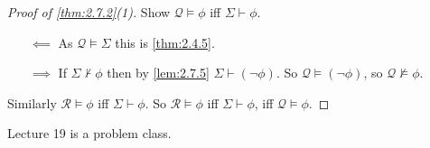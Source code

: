 \documentclass{article}
\newcommand{\rb}[1]{\left( #1 \right)}
\newcommand{\notb}[1]{\rb{\neg #1}}
\theoremstyle{definition}\newtheorem{definition}{Definition}[subsection]
\theoremstyle{definition}\newtheorem{remark}[definition]{Remark}
\theoremstyle{definition}\newtheorem*{example}{Example}
\theoremstyle{definition}\newtheorem*{note}{Note}
\begin{document}
\begin{proof}[Proof of \ref{thm:2.7.2}(1)]
Show $ \mathcal{Q} \vDash \phi $ iff $ \Sigma \vdash \phi $.
\begin{itemize}
\item[$ \impliedby $] As $ \mathcal{Q} \vDash \Sigma $ this is \ref{thm:2.4.5}.
\item[$ \implies $] If $ \Sigma \not\vdash \phi $ then by \ref{lem:2.7.5} $ \Sigma \vdash \notb{\phi} $. So $ \mathcal{Q} \vDash \notb{\phi} $, so $ \mathcal{Q} \not\vDash \phi $.
\end{itemize}
Similarly $ \mathcal{R} \vDash \phi $ iff $ \Sigma \vdash \phi $. So $ \mathcal{R} \vDash \phi $ iff $ \Sigma \vdash \phi $, iff $ \mathcal{Q} \vDash \phi $.
\end{proof}


Lecture 19 is a problem class.
\end{document}
